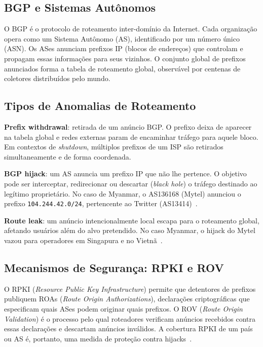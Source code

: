 \documentclass[12pt]{article}
\begin{document}
\subsection{BGP e Sistemas Autônomos}

O BGP é o protocolo de roteamento inter-domínio da Internet. Cada organização
opera como um Sistema Autônomo (AS), identificado por um número único (ASN).
Os ASes anunciam prefixos IP (blocos de endereços) que controlam e propagam
essas informações para seus vizinhos. O conjunto global de prefixos anunciados
forma a tabela de roteamento global, observável por centenas de coletores
distribuídos pelo mundo.

\subsection{Tipos de Anomalias de Roteamento}

\textbf{Prefix withdrawal}: retirada de um anúncio BGP. O prefixo deixa de
aparecer na tabela global e redes externas param de encaminhar tráfego para
aquele bloco. Em contextos de \textit{shutdown}, múltiplos prefixos de um
ISP são retirados simultaneamente e de forma coordenada.

\textbf{BGP hijack}: um AS anuncia um prefixo IP que não lhe pertence. O
objetivo pode ser interceptar, redirecionar ou descartar (\textit{black hole})
o tráfego destinado ao legítimo proprietário. No caso de Myanmar, o AS136168
(Mytel) anunciou o prefixo \texttt{104.244.42.0/24}, pertencente ao Twitter
(AS13414)~\cite{manrs:2021}.

\textbf{Route leak}: um anúncio intencionalmente local escapa para o roteamento
global, afetando usuários além do alvo pretendido. No caso Myanmar, o hijack
do Mytel vazou para operadores em Singapura e no Vietnã~\cite{ooni:multiperspective}.

\subsection{Mecanismos de Segurança: RPKI e ROV}

O RPKI (\textit{Resource Public Key Infrastructure}) permite que detentores
de prefixos publiquem ROAs (\textit{Route Origin Authorizations}), declarações
criptográficas que especificam quais ASes podem originar quais prefixos. O
ROV (\textit{Route Origin Validation}) é o processo pelo qual roteadores
verificam anúncios recebidos contra essas declarações e descartam anúncios
inválidos. A cobertura RPKI de um país ou AS é, portanto, uma medida de
proteção contra hijacks~\cite{manrs:2021}.
\end{document}
